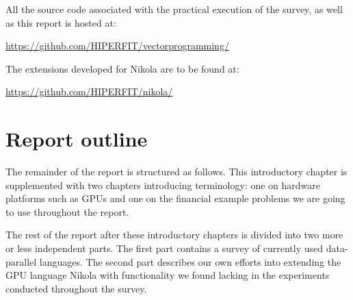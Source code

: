 





%
%

\vspace{5mm}\noindent
All the source code associated with the practical execution of the survey, as well as this report is hosted at:

\url{https://github.com/HIPERFIT/vectorprogramming/}

\vspace{2mm}\noindent
The extensions developed for Nikola are to be found at: 

\url{https://github.com/HIPERFIT/nikola/}

\section{Report outline}
The remainder of the report is structured as follows. This
introductory chapter is supplemented with two chapters introducing
terminology: one on hardware platforms such as GPUs and one on the
financial example problems we are going to use throughout the
report.

The rest of the report after these introductory chapters is divided
into two more or less independent parts. The first part contains a
survey of currently used data-parallel languages. The second part
describes our own efforts into extending the GPU language Nikola with
functionality we found lacking in the experiments conducted throughout
the survey.


